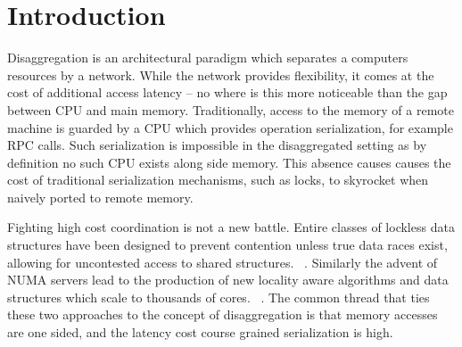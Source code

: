 

%




\section{Introduction}

Disaggregation is an architectural paradigm which separates a computers
resources by a network. While the network provides flexibility, it comes at the
cost of additional access latency
-- no where is this more noticeable than the gap between CPU and main memory.
Traditionally, access to the memory of a remote machine is guarded by a CPU
which provides operation serialization, for example RPC calls.  Such
serialization is impossible in the disaggregated setting as by definition no
such CPU exists along side memory. This absence causes causes the cost of
traditional serialization mechanisms, such as locks, to skyrocket when naively
ported to remote memory.

Fighting high cost coordination is not a new battle. Entire classes of lockless
data structures have been designed to prevent contention unless true data races
exist, allowing for uncontested access to shared structures.  ~\cite{}. Similarly the advent of NUMA servers lead to the
production of new locality aware algorithms and data structures which scale to
thousands of cores.  ~\cite{linux-scale,black-box-numa}. The common thread that ties these two approaches to the concept of
disaggregation is that memory accesses are one sided, and the latency cost
course grained serialization is high.

